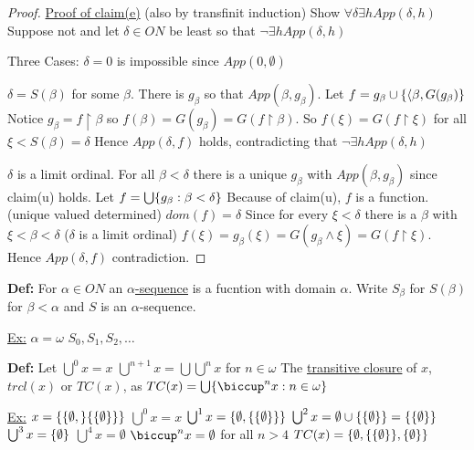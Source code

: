 \documentclass{article}
\begin{document}
\begin{proof}
        \underline{Proof of claim(e)} (also by transfinit induction)
        Show $\forall \delta \exists h App(\delta,h)$
        Suppose not and let $\delta \in ON$ be least so that $\neg \exists h App(\delta,h)$

        Three Cases:
        $\delta = 0$ is impossible since $App(0,\emptyset)$

        $\delta = S(\beta)$ for some $\beta$.
        There is $g_{\beta}$ so that $App(\beta,g_{\beta})$.
        Let $f = g_{\beta} \cup \{\langle \beta, G(g_{\beta})\}$
        Notice $g_{\beta} = f \upharpoonright \beta$ so $f(\beta) = G(g_{\beta}) = G(f \upharpoonright \beta)$.
        So $f(\xi) = G(f \upharpoonright \xi)$ for all $\xi < S(\beta) = \delta$
        Hence $App(\delta,f)$ holds, contradicting that $\neg \exists h App(\delta,h)$

        $\delta$ is a limit ordinal.
        For all $\beta < \delta$ there is a unique $g_{\beta}$ with $App(\beta,g_{\beta})$ since claim(u) holds.
        Let $f = \bigcup \{g_{\beta} : \beta < \delta\}$
        Because of claim(u), $f$ is a function. (unique valued determined)
        $dom(f) = \delta$
        Since for every $\xi < \delta$ there is a $\beta$ with $\xi < \beta < \delta$ ($\delta$ is a limit ordinal)
        $f(\xi) = g_{\beta}(\xi) = G(g_{\beta} \wedge \xi) = G(f \upharpoonright \xi)$.
        Hence $App(\delta,f)$ contradiction.

        \end{proof}


    \textbf{Def:} For $\alpha \in ON$ an \underline{$\alpha$-sequence} is a fucntion with domain $\alpha$.
    Write $S_{\beta}$ for $S(\beta)$ for $\beta < \alpha$ and $S$ is an $\alpha$-sequence.

    \underline{Ex:} $\alpha = \omega$ $S_0,S_1,S_2, \dots$

    \textbf{Def:} Let $\bigcup^0 x = x$
    $\bigcup^{n+1} x = \bigcup \bigcup^n x$ for $n \in  \omega$
    The \underline{transitive closure} of $x$, $trcl(x)$ or $TC(x)$, as
    $TC(x) = \bigcup \set{\biccup^n x : n \in \omega}$

    \underline{Ex:} $ x = \{\{\emptyset,\}\{\{\emptyset\}\}\}$
    $\bigcup^0 x = x$
    $\bigcup^1 x = \{\emptyset,\{\{\emptyset\}\}\}$
    $\bigcup^2 x = \emptyset \cup \{\{\emptyset\}\} = \{\{\emptyset\}\}$
    $\bigcup^3 x = \{\emptyset\}$
    $\bigcup^4 x = \emptyset$
    $\biccup^n x = \emptyset$ for all $n > 4$
    $TC(x) = \{\emptyset , \{\{\emptyset\}\},\{\emptyset\}\}$
\end{document}
